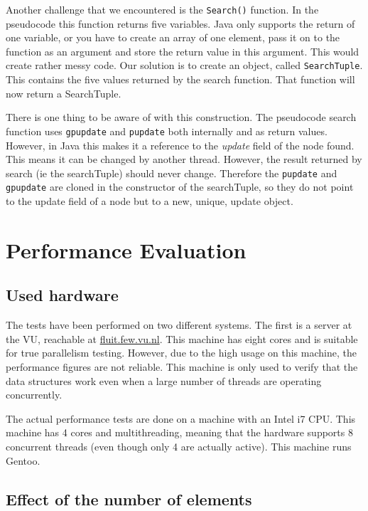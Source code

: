 \documentclass[a4paper]{article}
\begin{document}
Another challenge that we encountered is the \texttt{Search()} function. In the pseudocode
this function returns five variables. Java only supports the return of one variable, or
you have to create an array of one element, pass it on to the function as an argument and
store the return value in this argument. This would create rather messy code. Our solution 
is to create an object, called \texttt{SearchTuple}. This contains the five values
returned by the search function. That function will now return a SearchTuple.

There is one thing to be aware of with this construction. The pseudocode search function
uses \texttt{gpupdate} and \texttt{pupdate} both internally and as return values. However,
in Java this makes it a reference to the \emph{update} field of the node found. This means
it can be changed by another thread. However, the result returned by search (ie the
searchTuple) should never change. Therefore the \texttt{pupdate} and \texttt{gpupdate} are
cloned in the constructor of the searchTuple, so they do not point to the update field of
a node but to a new, unique, update object.

\section{Performance Evaluation}

\subsection{Used hardware}

The tests have been performed on two different systems. The first is a server at the VU,
reachable at \url{fluit.few.vu.nl}. This machine has eight cores and is suitable for true
parallelism testing. However, due to the high usage on this machine, the performance 
figures are not reliable. This machine is only used to verify that the data structures 
work even when a large number of threads are operating concurrently.

The actual performance tests are done on a machine with an Intel i7 CPU. This machine has
4 cores and multithreading, meaning that the hardware supports 8 concurrent threads (even
though only 4 are actually active). This machine runs Gentoo.

\subsection{Effect of the number of elements}
\end{document}

